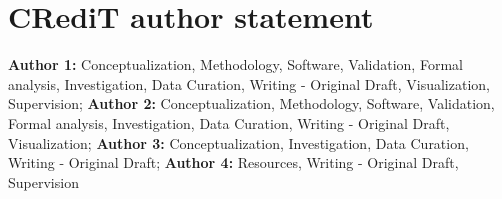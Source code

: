 \documentclass[]{elsarticle} %
\begin{document}
\hypertarget{credit-author-statement}{%
\section{CRediT author statement}\label{credit-author-statement}}

\textbf{Author 1:} Conceptualization, Methodology, Software, Validation,
Formal analysis, Investigation, Data Curation, Writing - Original Draft,
Visualization, Supervision; \textbf{Author 2:} Conceptualization,
Methodology, Software, Validation, Formal analysis, Investigation, Data
Curation, Writing - Original Draft, Visualization; \textbf{Author 3:}
Conceptualization, Investigation, Data Curation, Writing - Original
Draft; \textbf{Author 4:} Resources, Writing - Original Draft,
Supervision
\end{document}
